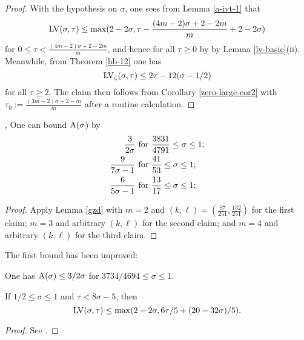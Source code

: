 \begin{proof} With the hypothesis on $\sigma$, one sees from Lemma \ref{a-ivt-1} that
$$ \mathrm{LV}(\sigma,\tau) \leq \max( 2 - 2 \sigma, \tau - \frac{(4m-2)\sigma + 2-2m}{m} + 2-2\sigma)$$
for $0 \leq \tau < \frac{(4m-2)\sigma + 2-2m}{m}$, and hence for all $\tau \geq 0$ by by Lemma \ref{lv-basic}(ii).  Meanwhile, from Theorem \ref{hb-12} one has
$$\mathrm{LV}_\zeta(\sigma,\tau) \leq 2\tau - 12 (\sigma-1/2)$$
for all $\tau \geq 2$.  The claim then follows from Corollary
\ref{zero-large-cor2} with $\tau_0 := \frac{(3m-2)\sigma+2-m}{m}$ after a routine calculation.
\end{proof}

\begin{corollary}\label{further_ivic_zero}\cite{ivic_exponent_1980}, \cite[Theorem 11.4]{ivic} One can bound $\mathrm{A}(\sigma$) by
\begin{align*}
 \frac{3}{2\sigma} &\hbox{ for } \frac{3831}{4791} \leq \sigma \leq 1;\\
 \frac{9}{7\sigma-1} &\hbox{ for } \frac{41}{53} \leq \sigma \leq 1; \\
 \frac{6}{5\sigma-1} &\hbox{ for } \frac{13}{17} \leq \sigma \leq 1;
\end{align*}
\end{corollary}

\begin{proof}  Apply Lemma \ref{gzd} with $m=2$ and $(k,\ell) = (\frac{97}{251}, \frac{132}{251})$ for the first claim; $m=3$ and arbitrary $(k,\ell)$ for the second claim; and $m=4$ and arbitrary $(k,\ell)$ for the third claim.
\end{proof}

The first bound has been improved:

\begin{theorem}\label{bourgain-zero-density-2000} One has $\mathrm{A}(\sigma) \leq 3/2\sigma$ for $3734/4694 \leq \sigma \leq 1$.
\end{theorem}

\begin{lemma}\label{a-ivt}  If $1/2 \leq \sigma \leq 1$ and $\tau < 8\sigma-5$, then
    $$ \mathrm{LV}(\sigma,\tau) \leq \max( 2-2\sigma, 6\tau/5 + (20-32\sigma)/5 ).$$
\end{lemma}

\begin{proof} See \cite[(11.95)]{ivic}.
\end{proof}

